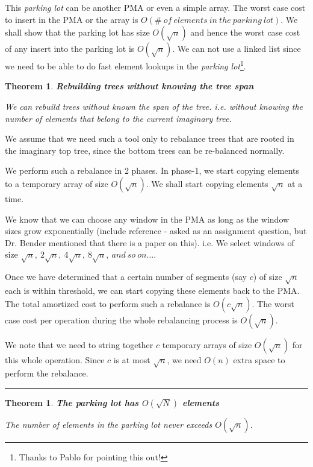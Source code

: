 \documentclass[10pt]{article}
\newenvironment{proof}{{\bf Proof:  }}{\hfill\rule{2mm}{2mm}}
\newtheorem{theorem}[fact]{Theorem}
\begin{document}
This \textit{parking lot} can be another PMA or even a simple array. 
The worst case cost to insert in the PMA or the array is
$O(\#\ of\ elements\ in\ the\ parking\ lot)$. We shall show that the
parking lot has size $O(\sqrt{n})$ and hence the worst case cost of
any insert into the parking lot is $O(\sqrt{n})$. We can not use a
linked list since we need to be able to do fast element lookups in the
\textit{parking lot}\footnote{Thanks to Pablo for pointing this out!}.

\begin{theorem}
\textbf{Rebuilding trees without knowing the tree span}

We can rebuild trees without known the span of the tree. i.e. without
knowing the number of elements that belong to the current imaginary
tree.
\end{theorem}

\begin{proof}
We assume that we need such a tool only to rebalance trees that are
rooted in the imaginary top tree, since the bottom trees can be
re-balanced normally.

We perform such a rebalance in 2 phases. In phase-1, we start copying
elements to a temporary array of size $O(\sqrt{n})$. We shall start
copying elements $\sqrt{n}$ at a time.

We know that we can choose any window in the PMA as long as the window
sizes grow exponentially (include reference - asked as an assignment
question, but Dr. Bender mentioned that there is a paper on
this). i.e. We select windows of size
$\sqrt{n},\ 2\sqrt{n},\ 4\sqrt{n},\ 8\sqrt{n},\ and\ so\ on\ldots{}$.

Once we have determined that a certain number of segments (say $c$) of
size $\sqrt{n}$ each is within threshold, we can start copying these
elements back to the PMA. The total amortized cost to perform such a
rebalance is $O(c\sqrt{n})$. The worst case cost per operation during
the whole rebalancing process is $O(\sqrt{n})$.

We note that we need to string together $c$ temporary arrays of size
$O(\sqrt{n})$ for this whole operation. Since $c$ is at most
$\sqrt{n}$, we need $O(n)$ extra space to perform the rebalance.
\end{proof}

\begin{theorem}
\textbf{The parking lot has $O(\sqrt{N})$ elements}

The number of elements in the parking lot never exceeds $O(\sqrt{n})$.
\end{theorem}
\end{document}
